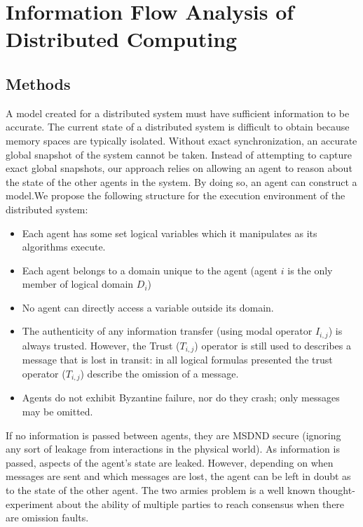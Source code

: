 

\chapter{Information Flow Analysis of Distributed Computing}


\section{Methods}

A model created for a distributed system must have sufficient information to be accurate.
The current state of a distributed system is difficult to obtain because memory spaces are typically isolated.
Without exact synchronization, an accurate global snapshot of the system cannot be taken.
Instead of attempting to capture exact global snapshots, our approach relies on allowing an agent to reason about the state of the other agents in the system.
By doing so, an agent can construct a model.We propose the following structure for the execution environment of the distributed system:

\begin{itemize}
    \item Each agent has some set logical variables which it manipulates as its algorithms execute.
    \item Each agent belongs to a domain unique to the agent (agent $i$ is the only member of logical domain $D_i$)
    \item No agent can directly access a variable outside its domain.
    \item The authenticity of any information transfer (using modal operator $I_{i,j}$) is always trusted. However, the Trust ($T_{i,j}$) operator is still used to describes a message that is lost in transit: in all logical formulas presented the trust operator ($T_{i,j}$) describe the omission of a message.
    \item Agents do not exhibit Byzantine failure, nor do they crash; only messages may be omitted.
\end{itemize}

If no information is passed between agents, they are MSDND secure (ignoring any sort of leakage from interactions in the physical world).
As information is passed, aspects of the agent's state are leaked.
However, depending on when messages are sent and which messages are lost, the agent can be left in doubt as to the state of the other agent.
The two armies problem is a well known thought-experiment about the ability of multiple parties to reach consensus when there are omission faults.

